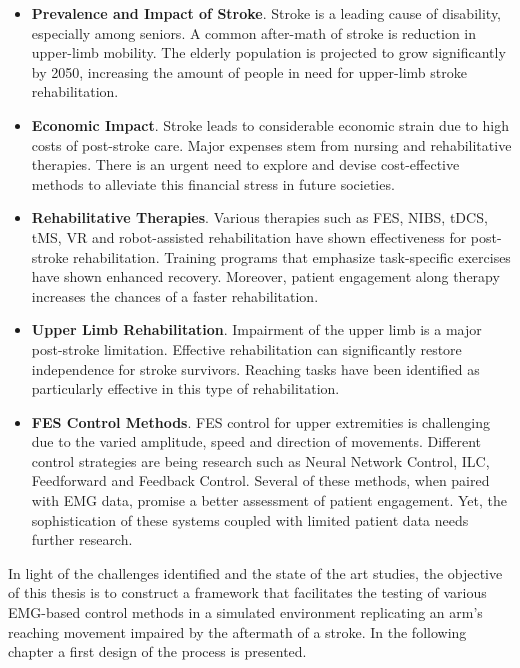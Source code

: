 \begin{itemize}
    \item \textbf{Prevalence and Impact of Stroke}. Stroke is a leading cause of disability, especially among seniors. A common after-math of stroke is reduction in upper-limb mobility. The elderly population is projected to grow significantly by 2050, increasing the amount of people in need for upper-limb stroke rehabilitation.
    \item \textbf{Economic Impact}. Stroke leads to considerable economic strain due to high costs of post-stroke care. Major expenses stem from nursing and rehabilitative therapies. There is an urgent need to explore and devise cost-effective methods to alleviate this financial stress in future societies.
    \item\textbf{Rehabilitative Therapies}. Various therapies such as FES, NIBS, tDCS, tMS, VR and robot-assisted rehabilitation have shown effectiveness for post-stroke rehabilitation. Training programs that emphasize task-specific exercises have shown enhanced recovery. Moreover, patient engagement along therapy increases the chances of a faster rehabilitation.

    \item \textbf{Upper Limb Rehabilitation}. Impairment of the upper limb is a major post-stroke limitation. Effective rehabilitation can significantly restore independence for stroke survivors. Reaching tasks have been identified as particularly effective in this type of rehabilitation.


    \item\textbf{FES Control Methods}. FES control for upper extremities is challenging due to the varied amplitude, speed and direction of movements. Different control strategies are being research such as Neural Network Control, ILC, Feedforward and Feedback Control. Several of these methods, when paired with EMG data, promise a better assessment of patient engagement. Yet, the sophistication of these systems coupled with limited patient data needs further research.

\end{itemize}

In light of the challenges identified and the state of the art studies, the objective of this thesis is to construct a framework that facilitates the testing of various EMG-based control methods in a simulated environment replicating an arm's reaching movement impaired by the aftermath of a stroke. In the following chapter a first design of the process is presented.